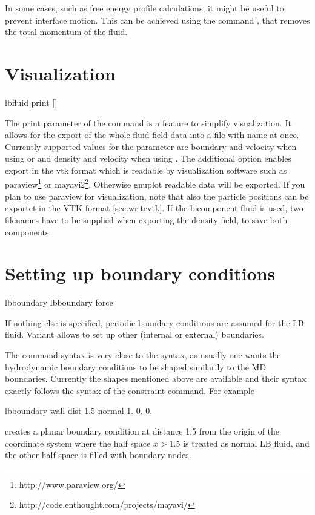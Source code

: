 In some cases, such as free energy profile calculations, it might be useful to prevent interface motion. This can be achieved using the command , that removes the total momentum of the fluid.


\section{Visualization}
\label{ssec:LBvisualization}
\begin{essyntax}
  lbfluid print    []
\end{essyntax}
The print parameter of the  command is a feature to simplify visualization. It allows for the export of the whole fluid field data into a 
file with name  at once. Currently supported values for the 
parameter  are boundary and velocity when using  or  and density and velocity when using . The additional option 
 enables export in the vtk format which is readable by visualization software such as paraview\footnote{http://www.paraview.org/} or mayavi2\footnote{http://code.enthought.com/projects/mayavi/}. Otherwise gnuplot readable data will be 
exported. If you plan to use paraview for visualization, note that also the 
particle positions can be exportet in the VTK format \ref{sec:writevtk}.
If the  bicomponent fluid is used, two filenames have to be supplied when exporting the density field, to save both components.

\section{Setting up boundary conditions}
\begin{essyntax}
   lbboundary   
   lbboundary force 
  \begin{features}
  \end{features}
\end{essyntax}

If nothing else is specified, periodic boundary conditions are assumed
for the LB fluid. Variant  allows to set up other (internal
or external) boundaries.

The  command syntax is very close to the
 syntax, as usually one wants the hydrodynamic
boundary conditions to be shaped similarily to the MD
boundaries. Currently the shapes mentioned above are available and
their syntax exactly follows the syntax of the constraint command. For
example
\begin{tclcode}
  lbboundary wall dist 1.5 normal 1. 0. 0. 
\end{tclcode}
creates a planar boundary condition at distance 1.5 from the origin of
the coordinate system where the half space $x>1.5$ is treated as
normal LB fluid, and the other half space is filled with boundary
nodes.

